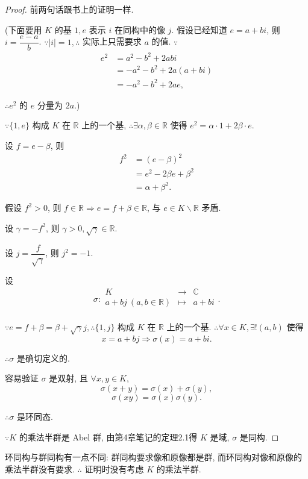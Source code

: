 \documentclass[color=black,device=normal,lang=cn,mode=geye]{elegantnote}
\begin{document}
\begin{proof}
    前两句话跟书上的证明一样.

    (下面要用 $K$ 的基 $1,e$ 表示 $i$ 在同构中的像 $j$. 假设已经知道 $e=a+bi$, 则 $i=\dfrac{e-a}{b}$. $\because|i|=1,\therefore$ 实际上只需要求 $a$ 的值. $\because$
    \begin{align*}
        e^2 & =a^2-b^2+2abi \\
        & =-a^2-b^2+2a(a+bi) \\
        & =-a^2-b^2+2ae,
    \end{align*}

    $\therefore e^2$ 的 $e$ 分量为 $2a$.)

    $\because\{1,e\}$ 构成 $K$ 在 $\mathbb{R}$ 上的一个基, $\therefore\exists\alpha,\beta\in\mathbb{R}$ 使得 $e^2=\alpha\cdot1+2\beta\cdot e$.

    设 $f=e-\beta$, 则
    \begin{align*}
        f^2 & =(e-\beta)^2 \\
        & =e^2-2\beta e+\beta^2 \\
        & =\alpha+\beta^2.
    \end{align*}

    假设 $f^2>0$, 则 $f\in\mathbb{R}\Rightarrow e=f+\beta\in\mathbb{R}$, 与 $e\in K\backslash\mathbb{R}$ 矛盾.

    设 $\gamma=-f^2$, 则 $\gamma>0,\sqrt{\gamma}\in\mathbb{R}$.

    设 $j=\dfrac{f}{\sqrt{\gamma}}$, 则 $j^2=-1$.

    设
    \[\sigma:\begin{array}{rcl}
        K & \to & \mathbb{C} \\
        a+bj\ (a,b\in\mathbb{R}) & \mapsto & a+bi \\
    \end{array}.\]

    $\because e=f+\beta=\beta+\sqrt{\gamma}j,\therefore\{1,j\}$ 构成 $K$ 在 $\mathbb{R}$ 上的一个基. $\therefore\forall x\in K,\exists!(a,b)$ 使得
    \[x=a+bj\Rightarrow\sigma(x)=a+bi.\]

    $\therefore\sigma$ 是确切定义的.

    容易验证 $\sigma$ 是双射, 且 $\forall x,y\in K$,
    \[\sigma(x+y)=\sigma(x)+\sigma(y),\]
    \[\sigma(xy)=\sigma(x)\sigma(y).\]

    $\therefore\sigma$ 是环同态.

    $\because K$ 的乘法半群是 Abel 群, 由第4章笔记的定理2.1得 $K$ 是域, $\sigma$ 是同构.
\end{proof}
\begin{note}
    环同构与群同构有一点不同: 群同构要求像和原像都是群, 而环同构对像和原像的乘法半群没有要求. $\therefore$ 证明时没有考虑 $K$ 的乘法半群.
\end{note}
\end{document}
